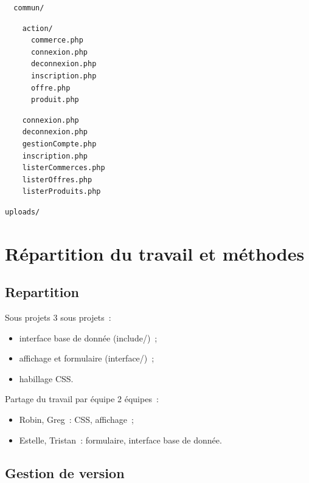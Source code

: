 \documentclass{beamer}
\begin{document}
\begin{frame}[fragile]
\begin{multicols}{3}
{\begin{Verbatim}
  		\end{Verbatim}
\color{blue}
		\begin{Verbatim}
  commun/
    		\end{Verbatim}
\color{forestgreen}
		\begin{Verbatim}
    action/
      commerce.php
      connexion.php
      deconnexion.php
      inscription.php
      offre.php
      produit.php
    		\end{Verbatim}
\color{frenchblue}
		\begin{Verbatim}
    connexion.php
    deconnexion.php
    gestionCompte.php
    inscription.php
    listerCommerces.php
    listerOffres.php
    listerProduits.php
		\end{Verbatim}
\color{blue}
		\begin{Verbatim}
uploads/
		\end{Verbatim}
		}
	\end{multicols}
\end{frame}

\section{Répartition du travail et méthodes}

\subsection{Repartition}

\begin{frame}{Sous projets}
	3 sous projets~:
	\begin{itemize}
		\item interface base de donnée (include/)~;
		\item affichage et formulaire (interface/)~;
		\item habillage CSS.
	\end{itemize}
\end{frame}

\begin{frame}{Partage du travail par équipe}
	2 équipes~:
	\begin{itemize}
		\item Robin, Greg~: CSS, affichage~;
		\item Estelle, Tristan~: formulaire, interface base de donnée.
	\end{itemize}

\end{frame}

\subsection{Gestion de version}
\end{document}
